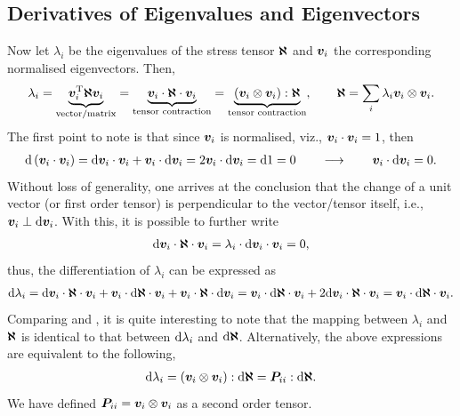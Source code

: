 \subsection{Derivatives of Eigenvalues and Eigenvectors}\label{sec:derivative_eigen}
Now let $\lambda_i$ be the eigenvalues of the stress tensor $\bm{\aleph}$ and $\bm{v}_i$ the corresponding normalised eigenvectors.
Then,
\begin{gather}\label{eq:eigenvalue_def}
    \lambda_i=\underbrace{\bm{v}_i^{\mathrm{T}}\bm{\aleph}\bm{v}_i}_{\text{vector/matrix}}=\underbrace{\bm{v}_i\cdot\bm{\aleph}\cdot\bm{v}_i}_{\text{tensor contraction}}=\underbrace{\left(\bm{v}_i\otimes\bm{v}_i\right):\bm{\aleph}}_{\text{tensor contraction}},\qquad
    \bm{\aleph}=\sum_{i}\lambda_i\bm{v}_i\otimes\bm{v}_i.
\end{gather}
The first point to note is that since $\bm{v}_i$ is normalised, viz., $\bm{v}_i\cdot\bm{v}_i=1$, then
\begin{gather}
    \mathrm{d}\left(\bm{v}_i\cdot\bm{v}_i\right)=\mathrm{d}\bm{v}_i\cdot\bm{v}_i+\bm{v}_i\cdot\mathrm{d}\bm{v}_i=2\bm{v}_i\cdot\mathrm{d}\bm{v}_i=\mathrm{d}1=0\qquad\longrightarrow\qquad\bm{v}_i\cdot\mathrm{d}\bm{v}_i=0.
\end{gather}
Without loss of generality, one arrives at the conclusion that the change of a unit vector (or first order tensor) is perpendicular to the vector/tensor itself, i.e., $\bm{v}_i\perp\mathrm{d}\bm{v}_i$.
With this, it is possible to further write
\begin{gather}
    \mathrm{d}\bm{v}_i\cdot\bm{\aleph}\cdot\bm{v}_i=\lambda_i\cdot\mathrm{d}\bm{v}_i\cdot\bm{v}_i=0,
\end{gather}
thus, the differentiation of $\lambda_i$ can be expressed as
\begin{gather}\label{eq:eigenvalue_diff_def}
    \mathrm{d}\lambda_i=\mathrm{d}\bm{v}_i\cdot\bm{\aleph}\cdot\bm{v}_i+\bm{v}_i\cdot\mathrm{d}\bm{\aleph}\cdot\bm{v}_i+\bm{v}_i\cdot\bm{\aleph}\cdot\mathrm{d}\bm{v}_i=\bm{v}_i\cdot\mathrm{d}\bm{\aleph}\cdot\bm{v}_i+2\mathrm{d}\bm{v}_i\cdot\bm{\aleph}\cdot\bm{v}_i=\bm{v}_i\cdot\mathrm{d}\bm{\aleph}\cdot\bm{v}_i.
\end{gather}
Comparing  and , it is quite interesting to note that the mapping between $\lambda_i$ and $\bm{\aleph}$ is identical to that between $\mathrm{d}\lambda_i$ and $\mathrm{d}\bm{\aleph}$.
Alternatively, the above expressions are equivalent to the following,
\begin{gather}
    \mathrm{d}\lambda_i=\left(\bm{v}_i\otimes\bm{v}_i\right):\mathrm{d}\bm{\aleph}=\bm{P}_{ii}:\mathrm{d}\bm{\aleph}.
\end{gather}
We have defined $\bm{P}_{ii}=\bm{v}_i\otimes\bm{v}_i$ as a second order tensor.
